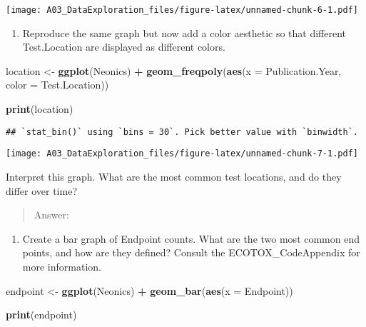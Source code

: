 \documentclass[]{article}
\newenvironment{Shaded}{\begin{snugshade}}{\end{snugshade}}
\newcommand{\DataTypeTok}[1]{\textcolor[rgb]{0.13,0.29,0.53}{#1}}
\newcommand{\KeywordTok}[1]{\textcolor[rgb]{0.13,0.29,0.53}{\textbf{#1}}}
\newcommand{\NormalTok}[1]{#1}
\newcommand{\OperatorTok}[1]{\textcolor[rgb]{0.81,0.36,0.00}{\textbf{#1}}}
\newcommand{\StringTok}[1]{\textcolor[rgb]{0.31,0.60,0.02}{#1}}
\providecommand{\tightlist}{%
  \setlength{\itemsep}{0pt}\setlength{\parskip}{0pt}}
\begin{document}
\texttt{[image: A03\_DataExploration\_files/figure-latex/unnamed-chunk-6-1.pdf]}

\begin{enumerate}
\def\labelenumi{\arabic{enumi}.}
\setcounter{enumi}{9}
\tightlist
\item
  Reproduce the same graph but now add a color aesthetic so that
  different Test.Location are displayed as different colors.
\end{enumerate}

\begin{Shaded}
\begin{Highlighting}[]
\NormalTok{location <-}\StringTok{ }\KeywordTok{ggplot}\NormalTok{(Neonics) }\OperatorTok{+}
\StringTok{  }\KeywordTok{geom_freqpoly}\NormalTok{(}\KeywordTok{aes}\NormalTok{(}\DataTypeTok{x =}\NormalTok{ Publication.Year, }\DataTypeTok{color =}\NormalTok{ Test.Location))}
  
\KeywordTok{print}\NormalTok{(location)}
\end{Highlighting}
\end{Shaded}

\begin{verbatim}
## `stat_bin()` using `bins = 30`. Pick better value with `binwidth`.
\end{verbatim}

\texttt{[image: A03\_DataExploration\_files/figure-latex/unnamed-chunk-7-1.pdf]}

Interpret this graph. What are the most common test locations, and do
they differ over time?

\begin{quote}
Answer:
\end{quote}

\begin{enumerate}
\def\labelenumi{\arabic{enumi}.}
\setcounter{enumi}{10}
\tightlist
\item
  Create a bar graph of Endpoint counts. What are the two most common
  end points, and how are they defined? Consult the ECOTOX\_CodeAppendix
  for more information.
\end{enumerate}

\begin{Shaded}
\begin{Highlighting}[]
\NormalTok{endpoint <-}\StringTok{ }\KeywordTok{ggplot}\NormalTok{(Neonics) }\OperatorTok{+}
\StringTok{  }\KeywordTok{geom_bar}\NormalTok{(}\KeywordTok{aes}\NormalTok{(}\DataTypeTok{x =}\NormalTok{ Endpoint))}

\KeywordTok{print}\NormalTok{(endpoint)}
\end{Highlighting}
\end{Shaded}
\end{document}
